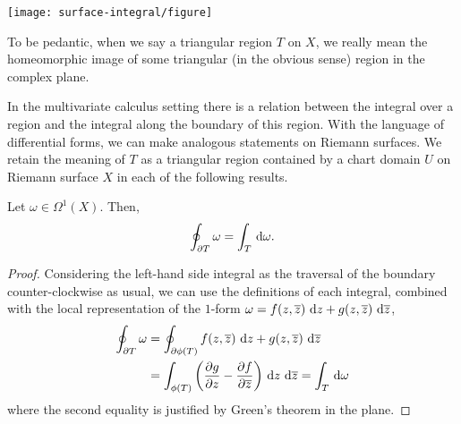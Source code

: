 \begin{marginfigure}
	\centering
	\texttt{[image: surface-integral/figure]}
	\caption{A integral over the triangular region $ T $ on a Riemann surface.}
\end{marginfigure}

\begin{remark}
	To be pedantic, when we say a triangular region $ T $ on $ X $, we really mean
	the homeomorphic image of some triangular (in the obvious sense) region in the
	complex plane.
\end{remark}

In the multivariate calculus setting there is a relation between the integral
over a region and the integral along the boundary of this region. With the
language of differential forms, we can make analogous statements on Riemann
surfaces. We retain the meaning of $ T $ as a triangular region contained by a
chart domain $ U $ on Riemann surface $ X $ in each of the following results.

\begin{theorem}
	Let $ \omega \in \Omega^1(X) $. Then,
	\begin{align*}
		\oint_{\partial T}{\omega} = \int_{T}{\operatorname{\, d\!}{\omega}}.
	\end{align*}
	\begin{proof}
		Considering the left-hand side integral as the traversal of the boundary
		counter-clockwise as usual, we can use the definitions of each integral,
		combined with the local representation of the $ 1 $-form $ \omega = f(z,
			\overline{z}) \operatorname{\, d\!}{z} + g(z, \overline{z}) \operatorname{\, d\!}{\overline{z}} $,
		\begin{align*}
			\oint_{\partial T}{\omega} & = \oint_{\partial \phi(T)}{f(z,
			\overline{z})\operatorname{\, d\!}{z} + g(z, \overline{z}) \operatorname{\, d\!}{\overline{z}}}           \\
			                           & = \int_{\phi(T)}{\left( \frac{\partial
					g}{\partial z} - \frac{\partial f}{\partial
					\overline{z}} \right)}\operatorname{\, d\!}{z}\operatorname{\, d\!}{\overline{z}}
			= \int_{T}{\operatorname{\, d\!}{\omega}}
		\end{align*}
		where the second equality is justified by Green's theorem in the plane.
	\end{proof}
\end{theorem}

\begin{marginfigure}
	\centering
	\caption{Visualizing the proof of Stokes' theorem.}
\end{marginfigure}

